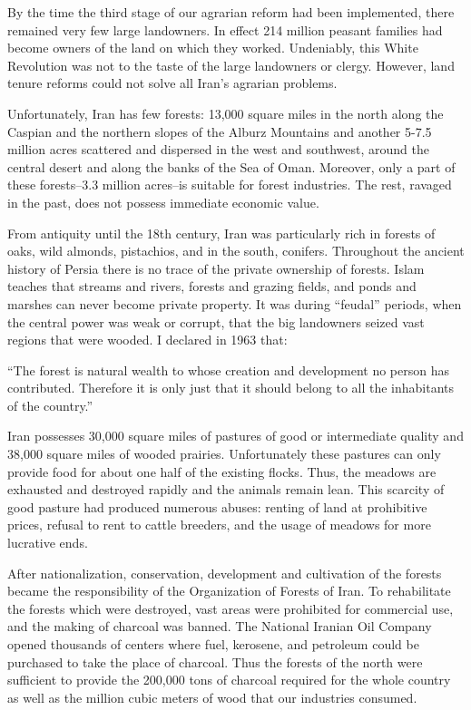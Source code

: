 By the time the third stage of our agrarian reform had been implemented, there remained very few large landowners. In effect 214 million peasant families had become owners of the land on which they worked. Undeniably, this White Revolution was not to the taste of the large landowners or clergy. However, land tenure reforms could not solve all Iran's agrarian problems. 

Unfortunately, Iran has few forests: 13,000 square miles in the north along the Caspian and the northern slopes of the Alburz Mountains and another 5-7.5 million acres scattered and dispersed in the west and southwest, around the central desert and along the banks of the Sea of Oman. Moreover, only a part of these forests--3.3 million acres--is suitable for forest industries. The rest, ravaged in the past, does not possess immediate economic value. 

From antiquity until the 18th century, Iran was particularly rich in forests of oaks, wild almonds, pistachios, and in the south, conifers. Throughout the ancient history of Persia there is no trace of the private ownership of forests. Islam teaches that streams and rivers, forests and grazing fields, and ponds and marshes can never become private property. It was during “feudal” periods, when the central power was weak or corrupt, that the big landowners seized vast regions that were wooded. I declared in 1963 that: 

“The forest is natural wealth to whose creation and development no person has contributed. Therefore it is only just that it should belong to all the inhabitants of the country.” 

Iran possesses 30,000 square miles of pastures of good or intermediate quality and 38,000 square miles of wooded prairies. Unfortunately these pastures can only provide food for about one half of the existing flocks. Thus, the meadows are exhausted and destroyed rapidly and the animals remain lean. This scarcity of good pasture had produced numerous abuses: renting of land at prohibitive prices, refusal to rent to cattle breeders, and the usage of meadows for more lucrative ends. 

After nationalization, conservation, development and cultivation of the forests became the responsibility of the Organization of Forests of Iran. To rehabilitate the forests which were destroyed, vast areas were prohibited for commercial use, and the making of charcoal was banned. The National Iranian Oil Company opened thousands of centers where fuel, kerosene, and petroleum could be purchased to take the place of charcoal. Thus the forests of the north were sufficient to provide the 200,000 tons of charcoal required for the whole country as well as the million cubic meters of wood that our industries consumed. 

